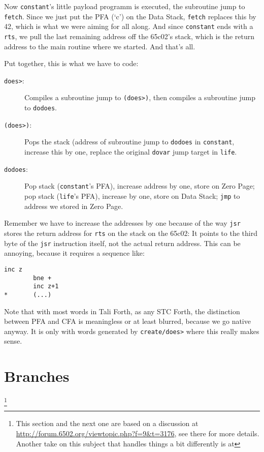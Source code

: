 Now \texttt{constant}'s little payload programm is executed, the subroutine jump
to \texttt{fetch}. Since we just put the PFA (`c') on the Data Stack,
\texttt{fetch} replaces this by 42, which is what we were aiming for all along.
And since \texttt{constant} ends with a \texttt{rts}, we pull the last remaining
address off the 65c02's stack, which is the return address to the main routine
where we started. And that's all. 

Put together, this is what we have to code: 

\begin{description}

        \item [\texttt{does>}:] Compiles a subroutine jump to \texttt{(does>)},
                then compiles a subroutine jump to \texttt{dodoes}.

        \item [\texttt{(does>)}:] Pops the stack (address of subroutine jump to
                \texttt{dodoes} in \texttt{constant}, increase this by one,
                replace the original \texttt{dovar} jump target in \texttt{life}. 

        \item [\texttt{dodoes}:] Pop stack (\texttt{constant}'s PFA), increase
                address by one, store on Zero Page; pop stack (\texttt{life}'s
                PFA), increase by one, store on Data Stack; \texttt{jmp} to
                address we stored in Zero Page. 

\end{description}

Remember we have to increase the addresses by one because of the way
\texttt{jsr} stores the return address for \texttt{rts} on the stack on the
65c02: It points to the third byte of the \texttt{jsr} instruction itself, not
the actual return address.  This can be annoying, because it requires a sequence
like:

\begin{lstlisting}[frame=single]
        inc z
        bne +
        inc z+1 
*       (...) 
\end{lstlisting}

Note that with most words in Tali Forth, as any STC Forth, the distinction
between PFA and CFA is meaningless or at least blurred, because we go native
anyway. It is only with words generated by \texttt{create/does>} where this
really makes sense.

\section{Branches} 
\footnote{This section and the next one are based on a discussion at
\href{http://forum.6502.org/viewtopic.php?f=9\&t=3176}
{http://forum.6502.org/viewtopic.php?f=9\&t=3176}, see there for more details.
Another take on this subject that handles things a bit differently is at
}

